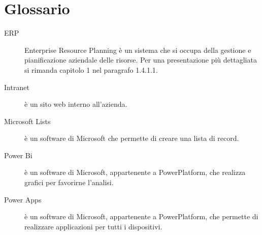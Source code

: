 \chapter{Glossario}
\begin{description}
    \item[ERP]  Enterprise Resource Planning è un sistema che si occupa della gestione e pianificazione aziendale delle risorse. Per una presentazione più dettagliata si rimanda  capitolo 1 nel paragrafo 1.4.1.1.
    \item[Intranet]  è un sito web interno all'azienda.
    \item[Microsoft Lists] è un software di Microsoft che permette di creare una lista di record.
    \item[Power Bi] è un software di Microsoft, appartenente a PowerPlatform, che realizza grafici per favorirne l'analisi.
    \item[Power Apps] è un software di Microsoft, appartenente a PowerPlatform, che permette di realizzare applicazioni per tutti i dispositivi.
\end{description}

